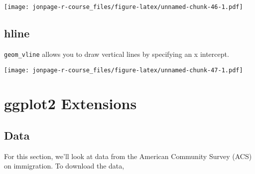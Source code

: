 \documentclass[]{book}
\newenvironment{Shaded}{\begin{snugshade}}{\end{snugshade}}
\newcommand{\KeywordTok}[1]{\textcolor[rgb]{0.13,0.29,0.53}{\textbf{{#1}}}}
\newcommand{\DataTypeTok}[1]{\textcolor[rgb]{0.13,0.29,0.53}{{#1}}}
\newcommand{\DecValTok}[1]{\textcolor[rgb]{0.00,0.00,0.81}{{#1}}}
\newcommand{\FloatTok}[1]{\textcolor[rgb]{0.00,0.00,0.81}{{#1}}}
\newcommand{\StringTok}[1]{\textcolor[rgb]{0.31,0.60,0.02}{{#1}}}
\newcommand{\NormalTok}[1]{{#1}}
\theoremstyle{definition}
\theoremstyle{definition}
\theoremstyle{remark}
\begin{document}
\texttt{[image: jonpage-r-course\_files/figure-latex/unnamed-chunk-46-1.pdf]}

\section{hline}\label{hline}

\texttt{geom\_vline} allows you to draw vertical lines by specifying an
x intercept.

\begin{Shaded}
\end{Shaded}

\texttt{[image: jonpage-r-course\_files/figure-latex/unnamed-chunk-47-1.pdf]}

\hypertarget{ggplot-exts}{\chapter{ggplot2
Extensions}\label{ggplot-exts}}

\section{Data}\label{data-2}

For this section, we'll look at data from the American Community Survey
(ACS) on immigration. To download the data,
\end{document}
